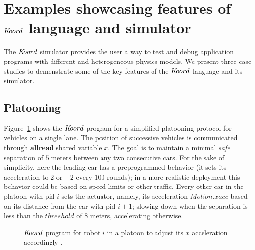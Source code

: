 \section{Examples showcasing features of $K\kern-2pt oord$ language and simulator}
\label{sec:experims}
The $K\kern-2pt oord$ simulator provides the user a way to test and  debug application programs with different and heterogeneous physics models. We present three case studies to demonstrate some of the key features of the $K\kern-2pt oord$ language and its  simulator.

\subsection{Platooning}
\label{sec:platooning}
Figure~\ref{fig:platooningapp} shows the $K\kern-2pt oord$ program for a simplified platooning protocol for vehicles on a single lane. The position of successive vehicles is communicated through  {\bf allread} shared variable $\mathit{x}$. The  goal is to maintain a minimal  \emph{safe} separation  of $5$ meters between any two consecutive cars. For the sake of simplicity, here the leading car  has a preprogrammed behavior (it sets its acceleration to $2$ or $-2$ every $100$ rounds); in a more realistic deployment this behavior could be based on speed limits or other traffic. 
Every other car in the platoon with pid $i$ sets the actuator, namely, its acceleration $\mathit{Motion.xacc}$ based on its distance from the car with pid $i+1$; slowing down when the separation is less than the $\mathit{threshold}$ of $8$ meters, accelerating otherwise. 

\begin{figure}[ht!]
\begin{mdframed}
    \noindent
    \begin{center}
        \scriptsize
        {}
        {} 
    \end{center}
\end{mdframed}
    \caption{$K\kern-2pt oord$ program for robot $i$ in a platoon to adjust its $x$ acceleration accordingly .}
    \label{fig:platooningapp}
\end{figure}

